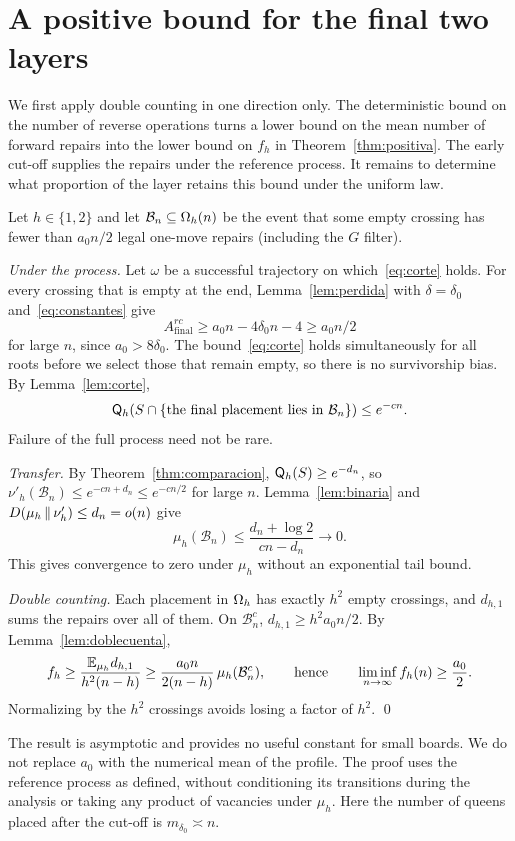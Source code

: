 \section{A positive bound for the final two layers}\label{sec:positiva}

We first apply double counting in one direction only. The deterministic bound on the number of reverse
operations turns a lower bound on the
mean number of forward repairs into the lower bound on $f_h$ in Theorem~\ref{thm:positiva}. The early
cut-off supplies the repairs
under the reference process. It remains to determine what proportion of the layer retains this bound under
the uniform law.

Let $h\in\{1,2\}$ and let $\mathcal B_n\subseteq\Omega_h(n)$ be the event that some empty crossing has fewer
than $a_0n/2$ legal one-move
repairs (including the $G$ filter).

\emph{Under the process.} Let $\omega$ be a successful trajectory on which~\eqref{eq:corte} holds. For every
crossing that is empty at
the end, Lemma~\ref{lem:perdida} with $\delta=\delta_0$ and~\eqref{eq:constantes} give \[
 A^{rc}_{\mathrm{final}}\ge a_0n-4\delta_0n-4\ge a_0n/2
\] for large $n$, since $a_0>8\delta_0$. The bound~\eqref{eq:corte} holds simultaneously for all roots
before we select those that
remain empty, so there is no survivorship bias. By Lemma~\ref{lem:corte}, \[
 \mathsf{Q}_h(S\cap\{\text{the final placement lies in }\mathcal B_n\})\le e^{-cn}.
\] Failure of the full process need not be rare.

\emph{Transfer.} By Theorem~\ref{thm:comparacion}, $\mathsf{Q}_h(S)\ge e^{-d_n}$, so
$\nu'_h(\mathcal B_n)\le e^{-cn+d_n}\le e^{-cn/2}$ for
large $n$. Lemma~\ref{lem:binaria} and $D(\mu_h\,\Vert\,\nu'_h)\le d_n=o(n)$ give \[
 \mu_h(\mathcal B_n)\le\frac{d_n+\log2}{cn-d_n}\longrightarrow0 .
\] This gives convergence to zero under $\mu_h$ without an exponential tail bound.

\emph{Double counting.} Each placement in $\Omega_h$ has exactly $h^2$ empty crossings, and $d_{h,1}$ sums the
repairs over all of them.
On $\mathcal B_n^c$, $d_{h,1}\ge h^2a_0n/2$. By Lemma~\ref{lem:doblecuenta}, \[
 f_h\ge\frac{\mathbb{E}_{\mu_h}d_{h,1}}{h^2(n-h)}\ge\frac{a_0n}{2(n-h)}\,\mu_h(\mathcal B_n^c),
 \qquad\text{hence}\qquad \liminf_{n\to\infty}f_h(n)\ge\frac{a_0}2 .
\] Normalizing by the $h^2$ crossings avoids losing a factor of $h^2$. \qed

\begin{observacion} The result is asymptotic and provides no useful constant for small boards. We do not
replace $a_0$ with the
numerical mean of the profile. The proof uses the reference process as defined, without conditioning its
transitions during the
analysis or taking any product of vacancies under $\mu_h$. Here the number of queens placed after the
cut-off is $m_{\delta_0}\asymp
n$. \end{observacion}
